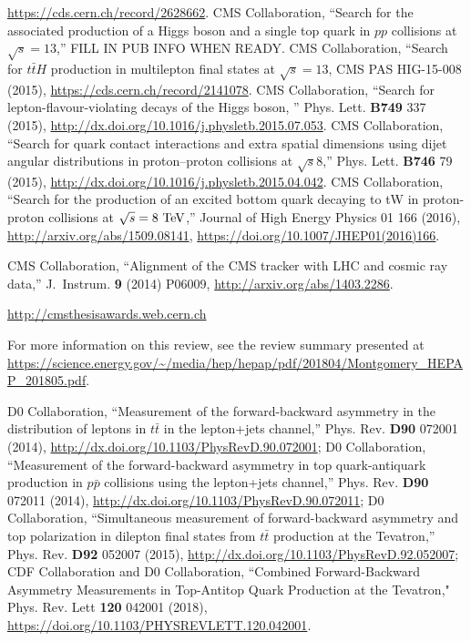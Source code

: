 \begin{thebibliography}{99}
    \url{https://cds.cern.ch/record/2628662}.
     CMS Collaboration, ``Search for the associated
    production of a Higgs boson and a single top quark in $pp$ collisions
    at $\sqrt{s} = 13$\TeV,'' FILL IN PUB INFO WHEN READY.
 CMS Collaboration, ``Search for $t\bar{t}H$
  production in multilepton final states at $\sqrt{s} = 13$\TeV, CMS PAS
  HIG-15-008 (2015), \url{https://cds.cern.ch/record/2141078}.
 CMS Collaboration, ``Search for lepton-flavour-violating decays of the Higgs boson, '' Phys. Lett. {\bf B749} 337 (2015), \url{http://dx.doi.org/10.1016/j.physletb.2015.07.053}.
CMS Collaboration, ``Search for quark contact interactions and extra spatial dimensions using dijet angular distributions in proton–proton collisions at $\sqrt{s}$8\TeV,'' Phys. Lett. {\bf B746} 79 (2015), \url{http://dx.doi.org/10.1016/j.physletb.2015.04.042}.
CMS Collaboration, ``Search for the production of an excited bottom quark decaying to tW in proton-proton collisions at $\sqrt{s} = 8\TeV$,'' Journal of High Energy Physics 01 166 (2016),  \url{http://arxiv.org/abs/1509.08141}, \url{https://doi.org/10.1007/JHEP01(2016)166}.

CMS Collaboration, ``Alignment of the CMS tracker with LHC and cosmic ray data,'' J.~Instrum. \textbf{9} (2014) P06009, \url{http://arxiv.org/abs/1403.2286}.

 \url{http://cmsthesisawards.web.cern.ch}

 For more information on this review, see the review summary presented at \url{https://science.energy.gov/~/media/hep/hepap/pdf/201804/Montgomery_HEPAP_201805.pdf}.


D0 Collaboration, ``Measurement of the forward-backward asymmetry in the distribution of leptons in $t\bar{t}$ in the lepton+jets channel,'' Phys. Rev. {\bf D90} 072001 (2014), \url{http://dx.doi.org/10.1103/PhysRevD.90.072001};
D0 Collaboration, ``Measurement of the forward-backward asymmetry in top quark-antiquark production in $p\bar{p}$ collisions using the lepton+jets channel,'' Phys. Rev. {\bf D90} 072011 (2014), \url{http://dx.doi.org/10.1103/PhysRevD.90.072011};
D0 Collaboration, ``Simultaneous measurement of forward-backward asymmetry and top polarization in dilepton final states from $t\bar{t}$ production at the Tevatron,'' Phys. Rev. {\bf D92} 052007 (2015), \url{http://dx.doi.org/10.1103/PhysRevD.92.052007};
CDF Collaboration and D0 Collaboration, ``Combined Forward-Backward Asymmetry Measurements in Top-Antitop Quark Production at the Tevatron," Phys. Rev. Lett {\bf 120} 042001 (2018), \url{https://doi.org/10.1103/PHYSREVLETT.120.042001}.


\end{thebibliography}
